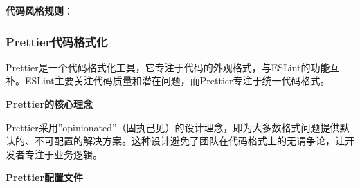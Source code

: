 \textbf{代码风格规则}：

\begin{Shaded}
\begin{Highlighting}[]
\OperatorTok{=}\NormalTok{ \{}\OperatorTok{:} \OperatorTok{,} \OperatorTok{:} \NormalTok{\}}\OperatorTok{;}  
\OperatorTok{=}\NormalTok{ \{ }\OperatorTok{:} \OperatorTok{,} \OperatorTok{:} \NormalTok{ \}}\OperatorTok{;}  

\OperatorTok{=} \OperatorTok{;}  
\OperatorTok{=} \OperatorTok{;}  

\OperatorTok{=}\NormalTok{ \{}
  \OperatorTok{:} \OperatorTok{,}
  \OperatorTok{:} \OperatorTok{,}  
\NormalTok{\}}\OperatorTok{;}
\end{Highlighting}
\end{Shaded}

\subsubsection{Prettier代码格式化}\label{prettierux4ee3ux7801ux683cux5f0fux5316}

Prettier是一个代码格式化工具，它专注于代码的外观格式，与ESLint的功能互补。ESLint主要关注代码质量和潜在问题，而Prettier专注于统一代码格式。

\textbf{Prettier的核心理念}

Prettier采用''opinionated''（固执己见）的设计理念，即为大多数格式问题提供默认的、不可配置的解决方案。这种设计避免了团队在代码格式上的无谓争论，让开发者专注于业务逻辑。

\textbf{Prettier配置文件}

